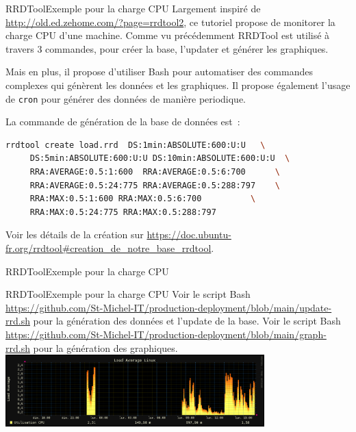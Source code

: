 \documentclass{beamer}
\begin{document}
    \begin{frame}[fragile]{RRDTool}{Exemple pour la charge CPU}
        Largement inspiré de \url{http://old.ed.zehome.com/?page=rrdtool2}, ce tutoriel propose de monitorer la charge CPU d'une machine.
        \bigbreak
        Comme vu précédemment RRDTool est utilisé à travers 3 commandes, pour créer la base, l'updater et générer les graphiques.

        Mais en plus, il propose d'utiliser Bash pour automatiser des commandes complexes qui génèrent les données et les graphiques.
        Il propose également l'usage de \lstinline{cron} pour générer des données de manière periodique.

        La commande de génération de la base de données est~:
        \begin{lstlisting}[language=bash,basicstyle=\ttfamily\tiny]
rrdtool create load.rrd  DS:1min:ABSOLUTE:600:U:U   \
     DS:5min:ABSOLUTE:600:U:U DS:10min:ABSOLUTE:600:U:U  \
     RRA:AVERAGE:0.5:1:600  RRA:AVERAGE:0.5:6:700      \
     RRA:AVERAGE:0.5:24:775 RRA:AVERAGE:0.5:288:797    \
     RRA:MAX:0.5:1:600 RRA:MAX:0.5:6:700          \
     RRA:MAX:0.5:24:775 RRA:MAX:0.5:288:797
        \end{lstlisting}
        Voir les détails de la création sur \url{https://doc.ubuntu-fr.org/rrdtool#creation_de_notre_base_rrdtool}.
    \end{frame}

    \begin{frame}[fragile]{RRDTool}{Exemple pour la charge CPU}
    \end{frame}

    \begin{frame}{RRDTool}{Exemple pour la charge CPU}
        Voir le script Bash \url{https://github.com/St-Michel-IT/production-deployment/blob/main/update-rrd.sh} pour la génération des données et l'update de la base.
        \bigbreak
        Voir le script Bash \url{https://github.com/St-Michel-IT/production-deployment/blob/main/graph-rrd.sh} pour la génération des graphiques.
        \bigbreak
        \centering
        \includegraphics[width=10cm]{image/../../load.equinoxe-day}
    \end{frame}
\end{document}
